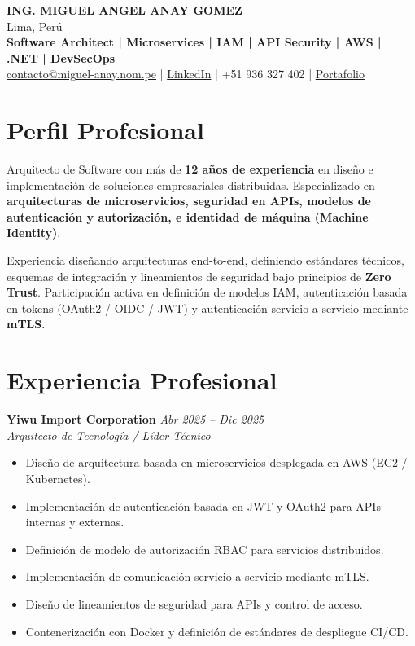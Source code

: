 \documentclass[11pt,a4paper]{article}
\begin{document}
\begin{center}
{\Large \textbf{ING. MIGUEL ANGEL ANAY GOMEZ}}\\
Lima, Perú\\
\textbf{Software Architect | Microservices | IAM | API Security | AWS | .NET | DevSecOps}\\

\href{mailto:contacto@miguel-anay.nom.pe}{contacto@miguel-anay.nom.pe} \;|\;
\href{https://www.linkedin.com/in/miguel-anay/}{LinkedIn} \;|\;
+51 936 327 402 \;|\;
\href{https://portfolio.miguel-anay.nom.pe}{Portafolio}
\end{center}

\vspace{0.3cm}

\section*{Perfil Profesional}

Arquitecto de Software con más de \textbf{12 años de experiencia} en diseño e implementación de soluciones empresariales distribuidas.  
Especializado en \textbf{arquitecturas de microservicios, seguridad en APIs, modelos de autenticación y autorización, e identidad de máquina (Machine Identity)}.  

Experiencia diseñando arquitecturas end-to-end, definiendo estándares técnicos, esquemas de integración y lineamientos de seguridad bajo principios de \textbf{Zero Trust}.  
Participación activa en definición de modelos IAM, autenticación basada en tokens (OAuth2 / OIDC / JWT) y autenticación servicio-a-servicio mediante \textbf{mTLS}.  


\section*{Experiencia Profesional}

\vspace{6pt}

\textbf{Yiwu Import Corporation} \hfill \textit{Abr 2025 – Dic 2025}\\
\textit{Arquitecto de Tecnología / Líder Técnico}

\begin{itemize}[leftmargin=*]
  \item Diseño de arquitectura basada en microservicios desplegada en AWS (EC2 / Kubernetes).
  \item Implementación de autenticación basada en JWT y OAuth2 para APIs internas y externas.
  \item Definición de modelo de autorización RBAC para servicios distribuidos.
  \item Implementación de comunicación servicio-a-servicio mediante mTLS.
  \item Diseño de lineamientos de seguridad para APIs y control de acceso.
  \item Contenerización con Docker y definición de estándares de despliegue CI/CD.
\end{itemize}
\end{document}
